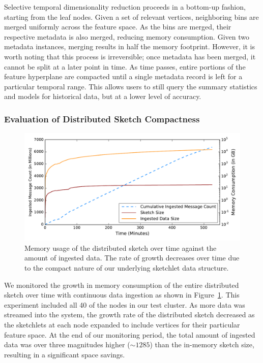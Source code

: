 Selective temporal dimensionality reduction proceeds in a bottom-up fashion, starting from the leaf nodes. Given a set of relevant vertices, neighboring bins are merged uniformly across the feature space. As the bins are merged, their respective metadata is also merged, reducing memory consumption. Given two metadata instances, merging results in half the memory footprint. However, it is worth noting that this process is irreversible; once metadata has been merged, it cannot be split at a later point in time. As time passes, entire portions of the feature hyperplane are compacted until a single metadata record is left for a particular temporal range. This allows users to still query the summary statistics and models for historical data, but at a lower level of accuracy.

\subsubsection{Evaluation of Distributed Sketch Compactness}

\begin{figure}[h]
    \centerline{\includegraphics[width=\linewidth]{figures/ing-and-mem-usage.pdf}}
    \caption{Memory usage of the distributed sketch over time against the amount of ingested data. The rate of growth decreases over time due to the compact nature of our underlying sketchlet data structure.}
    \label{fig:dist-sketch-mem-usage}
\end{figure}

We monitored the growth in memory consumption of the entire distributed sketch over time with continuous data ingestion as shown in Figure~\ref{fig:dist-sketch-mem-usage}. This experiment included all 40 of the nodes in our test cluster.  As more data was streamed into the system, the growth rate of the distributed sketch decreased as the sketchlets at each node expanded to include vertices for their particular feature space.  At the end of our monitoring period, the total amount of ingested data was over three magnitudes higher ($\sim 1285$) than the in-memory sketch size, resulting in a significant space savings.
